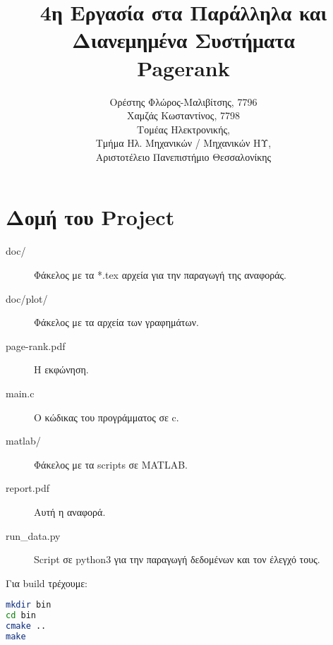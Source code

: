 
\usepackage{fontspec}
\setmainfont{DejaVu Serif}
\renewcommand{\contentsname}{Περιεχόμενα}
\renewcommand{\listfigurename}{Λίστα Σχημάτων}
\renewcommand{\figurename}{Σχήμα}
\renewcommand{\lstlistingname}{Καταχώρηση}
\renewcommand{\lstlistlistingname}{List of \lstlistingname s}

\title{4η Εργασία στα Παράλληλα και Διανεμημένα Συστήματα\\Pagerank}
\author{Ορέστης Φλώρος-Μαλιβίτσης, 7796\\
  Χαμζάς Κωσταντίνος, 7798\\
  Τομέας Ηλεκτρονικής,\\
  Τμήμα Ηλ. Μηχανικών / Μηχανικών ΗΥ,\\
  Αριστοτέλειο Πανεπιστήμιο Θεσσαλονίκης}
  

\maketitle
\tableofcontents
\newpage

\chapter*{Δομή του Project} \label{project-structure}

\begin{description}
	\item[doc/] Φάκελος με τα *.tex αρχεία για την παραγωγή της αναφοράς.
	\item[doc/plot/] Φάκελος με τα αρχεία των γραφημάτων.
	\item[page-rank.pdf] Η εκφώνηση.
	\item[main.c] Ο κώδικας του προγράμματος σε c.
	\item[matlab/] Φάκελος με τα scripts σε MATLAB.
	\item[report.pdf] Αυτή η αναφορά.
	\item[run\_data.py] Script σε python3 για την παραγωγή δεδομένων και τον έλεγχό τους.
\end{description}

\noindent Για build τρέχουμε:
\begin{lstlisting}[language=bash, caption={build commands}, escapechar=$]
mkdir bin
cd bin
cmake ..
make
\end{lstlisting}






